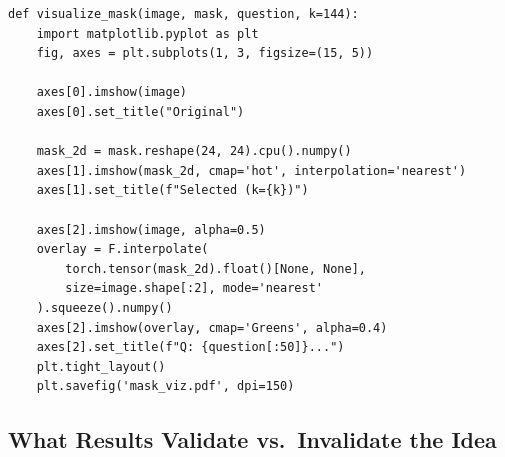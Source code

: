 \documentclass[11pt,a4paper]{article}
\begin{document}
\begin{lstlisting}[caption={Token selection overlay visualization.}]
def visualize_mask(image, mask, question, k=144):
    import matplotlib.pyplot as plt
    fig, axes = plt.subplots(1, 3, figsize=(15, 5))

    axes[0].imshow(image)
    axes[0].set_title("Original")

    mask_2d = mask.reshape(24, 24).cpu().numpy()
    axes[1].imshow(mask_2d, cmap='hot', interpolation='nearest')
    axes[1].set_title(f"Selected (k={k})")

    axes[2].imshow(image, alpha=0.5)
    overlay = F.interpolate(
        torch.tensor(mask_2d).float()[None, None],
        size=image.shape[:2], mode='nearest'
    ).squeeze().numpy()
    axes[2].imshow(overlay, cmap='Greens', alpha=0.4)
    axes[2].set_title(f"Q: {question[:50]}...")
    plt.tight_layout()
    plt.savefig('mask_viz.pdf', dpi=150)
\end{lstlisting}

\subsection{What Results Validate vs.\ Invalidate the Idea}


\end{document}

